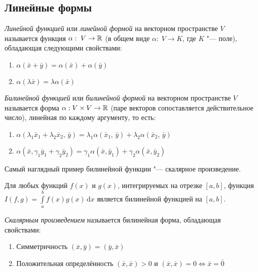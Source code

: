 \subsection*{Линейные формы}
\begin{definition}
  \textit{Линейной функцией} или \textit{линейной формой} на векторном пространстве $V$ называется функция $\alpha:\; V \to \mathbb{R}$ (в общем виде $\alpha:\; V \to K$, где $K$ "--- поле), обладающая следующими свойствами:
  \begin{enumerate}
    \item $\alpha(\bar{x} + \bar{y}) = \alpha(\bar{x}) + \alpha(\bar{y})$
    \item $\alpha(\lambda\bar{x}) = \lambda\alpha(\bar{x})$
  \end{enumerate}
\end{definition}
\begin{definition}
  \textit{Билинейной функцией} или \textit{билинейной формой} на векторном пространстве $V$ называется форма $\alpha: V \times V \to \mathbb{R}$ (паре векторов сопоставляется действительное число), линейная по каждому аргументу, то есть:
  \begin{enumerate}
    \item $\alpha(\lambda_1\bar{x}_1 + \lambda_2\bar{x}_2,\,\bar{y}) = \lambda_1\alpha(\bar{x}_1,\,\bar{y}) + \lambda_2\alpha(\bar{x}_2,\,\bar{y})$
    \item $\alpha(\bar{x}, \gamma_1\bar{y}_1 + \gamma_2\bar{y}_2) = \gamma_1\alpha(\bar{x},\bar{y}_1) + \gamma_2\alpha(\bar{x},\bar{y}_2)$
  \end{enumerate}
\end{definition}
\begin{example}
  Самый наглядный пример билинейной функции "--- скалярное произведение.

  Для любых функций $f(x)$ и $g(x)$, интегрируемых на отрезке $[a,b]$, функция $I(f,g) = \int\limits_a^b{f(x)g(x)\,\mathrm{d}x}$ является билинейной функцией на $[a,b]$.
\end{example}
\begin{definition}
  \textit{Скалярным произведением} называется билинейная форма, обладающая свойствами:
  \begin{enumerate}
    \item Симметричность $(\bar{x},\bar{y}) = (\bar{y},\bar{x})$
    \item Положительная определённость $(\bar{x},\bar{x}) > 0$ и $(\bar{x},\bar{x}) = 0 \Leftrightarrow \bar{x} = \bar{0}$
  \end{enumerate}
\end{definition}

